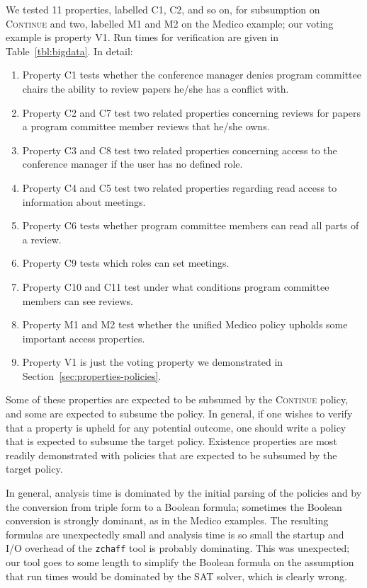 We tested 11 properties, labelled C1, C2, and so on, for subsumption
on \textsc{Continue} and two, labelled M1 and M2 on the Medico
example; our voting example is property V1.  Run times for
verification are given in Table~\ref{tbl:bigdata}.  In detail:
\begin{enumerate}
\item Property C1 tests whether the conference manager denies program
  committee chairs the ability to review papers he/she has a conflict
  with.
\item Property C2 and C7 test two related properties concerning
  reviews for papers a program committee member reviews that he/she
  owns.
\item Property C3 and C8 test two related properties concerning access
  to the conference manager if the user has no defined role.
\item Property C4 and C5 test two related properties regarding read
  access to information about meetings.
\item Property C6 tests whether program committee members can read
  all parts of a review.
\item Property C9 tests which roles can set meetings.
\item Property C10 and C11 test under what conditions program
  committee members can see reviews.
\item Property M1 and M2 test whether the unified Medico policy
  upholds some important access properties.
\item Property V1 is just the voting property we demonstrated in
  Section~\ref{sec:properties-policies}.
\end{enumerate}
Some of these properties are expected to be subsumed by the
\textsc{Continue} policy, and some are expected to subsume the policy.
In general, if one wishes to verify that a property is upheld for any
potential outcome, one should write a policy that is expected to
subsume the target policy.  Existence properties are most readily
demonstrated with policies that are expected to be subsumed by the
target policy.

In general, analysis time is dominated by the initial parsing of the
policies and by the conversion from triple form to a Boolean formula;
sometimes the Boolean conversion is strongly dominant, as in the
Medico examples.  The resulting formulas are unexpectedly small and
analysis time is so small the startup and I/O overhead of the
\texttt{zchaff} tool is probably dominating.  This was unexpected; our
tool goes to some length to simplify the Boolean formula on the
assumption that run times would be dominated by the SAT solver, which
is clearly wrong.

